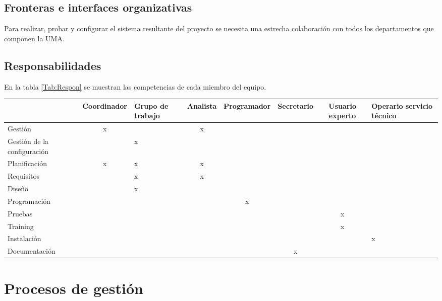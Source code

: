\documentclass[11pt,a4paper,spanish,twoside]{report}
\begin{document}
\section{Fronteras e interfaces organizativas}
Para realizar, probar y configurar el sistema resultante del proyecto se 
necesita una estrecha colaboración con todos los departamentos que componen 
la UMA. 

\section{Responsabilidades}
En la tabla \ref{Tab:Respon} se muestran las competencias de cada miembro del
equipo.
\begin{sidewaystable}[!h]
  \centering
  \scriptsize
  \begin{tabular}{l|c|b{1.5cm}<{\centering}|c|c|c|c|b{2.5cm}<{\centering}}
    & \textbf{Coordinador} & \textbf{Grupo de trabajo} &
    \textbf{Analista} & \textbf{Programador} & \textbf{Secretario} &
    \textbf{Usuario experto} & \textbf{Operario servicio técnico}\\
    \hline \hline
    Gestión                     & x &   & x &   &   &   &    \\ 
    \hline
    Gestión de la configuración &   & x &   &   &   &   &    \\
    \hline
    Planificación               & x & x & x &   &   &   &    \\
    \hline
    Requisitos                  &   & x & x &   &   &   &    \\
    \hline
    Diseño                      &   & x &   &   &   &   &    \\
    \hline
    Programación                &   &   &   & x &   &   &    \\
    \hline
    Pruebas                     &   &   &   &   &   & x &    \\
    \hline
    Training                    &   &   &   &   &   & x &    \\
    \hline
    Instalación                 &   &   &   &   &   &   & x  \\
    \hline
    Documentación               &   &   &   &   & x &   &    \\
    \hline
  \end{tabular}
  \caption{Responsabilidades de los miembros} \label{Tab:Respon}
\end{sidewaystable}

\chapter{Procesos de gestión}
\end{document}
